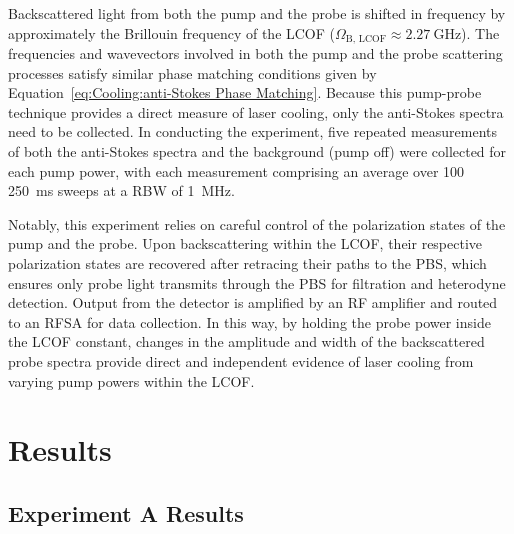 Backscattered light from both the pump and the probe is shifted in frequency by approximately the Brillouin frequency of the \ac{LCOF} (\(\Omega_{\mathrm{B,\,LCOF}} \approx \SI{2.27}{\giga\hertz}\)). The frequencies and wavevectors involved in both the pump and the probe scattering processes satisfy similar phase matching conditions given by Equation~\ref{eq:Cooling:anti-Stokes Phase Matching}. Because this pump-probe technique provides a direct measure of laser cooling, only the anti-Stokes spectra need to be collected. In conducting the experiment, five repeated measurements of both the anti-Stokes spectra and the background (pump off) were collected for each pump power, with each measurement comprising an average over 100 \SI{250}{\milli\second} sweeps at a \ac{RBW} of \SI{1}{\mega\hertz}.

Notably, this experiment relies on careful control of the polarization states of the pump and the probe. Upon backscattering within the \ac{LCOF}, their respective polarization states are recovered after retracing their paths to the \ac{PBS}, which ensures only probe light transmits through the \ac{PBS} for filtration and heterodyne detection. Output from the detector is amplified by an \ac{RF} amplifier and routed to an \ac{RFSA} for data collection. In this way, by holding the probe power inside the \ac{LCOF} constant, changes in the amplitude and width of the backscattered probe spectra provide direct and independent evidence of laser cooling from varying pump powers within the \ac{LCOF}.


\section{Results}
\label{Cooling:sec:Results}


\subsection{Experiment A Results}
\label{Cooling:subsec:ExperimentAResults}

